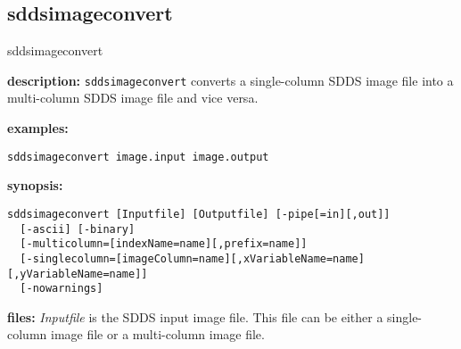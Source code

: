 %
\newpage
\subsection{sddsimageconvert}
\label{sddsimageconvert}

\begin{sddsprog}{sddsimageconvert}
  \item \textbf{description:} \verb|sddsimageconvert| converts a single-column SDDS image file into a multi-column SDDS image file and vice versa.
  \item \textbf{examples:}
  \begin{verbatim}
sddsimageconvert image.input image.output
  \end{verbatim}
  \item \textbf{synopsis:}
  \begin{verbatim}
sddsimageconvert [Inputfile] [Outputfile] [-pipe[=in][,out]]
  [-ascii] [-binary]
  [-multicolumn=[indexName=name][,prefix=name]]
  [-singlecolumn=[imageColumn=name][,xVariableName=name][,yVariableName=name]]
  [-nowarnings]
  \end{verbatim}
  \item \textbf{files:}
  \emph{Inputfile} is the SDDS input image file. This file can be either a single-column image file or a multi-column image file.


\end{sddsprog}
